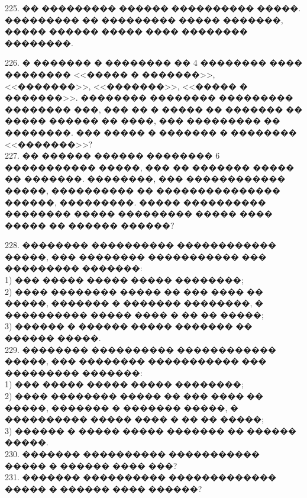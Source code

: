 \documentclass[12pt]{article}
\begin{document}
\begin{center}
\begin{figure}[ht!]
\end{figure}
\end{center}
225. �� ��������� ������ ���������� �����. ��������� �� ��������� ����� �������, ����� ������ ����� ���� �������� ��������.
\begin{center}
\begin{figure}[ht!]
\end{figure}
\end{center}
226. � ������� � �������� �� 4 �������� ���� �������� <<����� � �������>>, <<�������>>, <<�������>>, <<����� � �������>>. �������� �������� ��������� �������� ���, ��� �� � ����� �� ������� �� ����� ������ �� ����, ��� ��������� �� ��������. ��� ����� � ������� � �������� <<�������>>?\\
227. �� ������ ������ �������� 6 ����������� �����, ��� �� ������� ����� �� �������. ��������, ��� ������������ �����, ���������� �� ��������������� ������, ���������. ����� ���������� �������� ����� ��������� ����� ���� ����� �� ������ ������?
\begin{center}
\begin{figure}[ht!]
\end{figure}
\end{center}
228. �������� ���������� ������������ �����, ��� �������� ����������� ��� ��������� �������:\\
1) ��� ����� ����� ����� ��������;\\
2) ���� �������� ����� �� ��� ���� �� �����, ������� � ������� ��������, � ���������� ����� ���� � �� �� �����;\\
3) ������ � ������ ����� ������� �� ������ �����.\\
229. �������� ���������� ������������ �����, ��� �������� ����������� ��� ��������� �������:\\
1) ��� ����� ����� ����� ��������;\\
2) ���� �������� ����� �� ��� ���� �� �����, ������� � ������� �����, � ���������� ����� ���� � �� �� �����;\\
3) ������ � ����� ����� ������� �� ������ �����.\\
230. ������� ���������� ����������� ����� � ������ ���� ���?\\
231. ������� ���������� ������������� ����� � ������ ���� ������?\\
\end{document}
